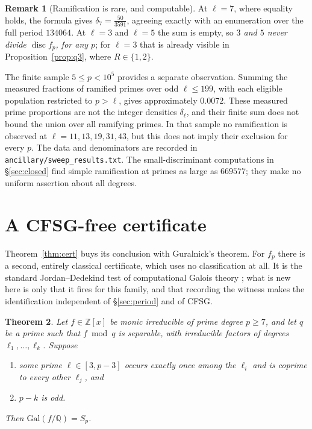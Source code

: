 \documentclass[11pt,a4paper]{amsart}
\newcommand{\Q}{\mathbb{Q}}
\newcommand{\Z}{\mathbb{Z}}
\newcommand{\Gal}{\mathrm{Gal}}
\newcommand{\disc}{\operatorname{disc}}
\theoremstyle{plain}
\newtheorem{theorem}{Theorem}
\theoremstyle{definition}
\newtheorem{remark}[theorem]{Remark}
\begin{document}
\begin{remark}[Ramification is rare, and computable]
At \(\ell=7\), where equality holds, the formula gives \(\delta_7=\tfrac{50}{3591}\), agreeing exactly with an enumeration over the full period \(134064\). At \(\ell=3\) and \(\ell=5\) the sum is empty, so \emph{\(3\) and \(5\) never divide \(\disc f_p\), for any \(p\)}; for \(\ell=3\) that is already visible in Proposition~\ref{prop:q3}, where \(R\in\{1,2\}\).

The finite sample \(5\le p<10^5\) provides a separate observation. Summing the measured fractions of ramified primes over odd \(\ell\le199\), with each eligible population restricted to \(p>\ell\), gives approximately \(0.0072\). These measured prime proportions are not the integer densities \(\delta_\ell\), and their finite sum does not bound the union over all ramifying primes. In that sample no ramification is observed at \(\ell=11,13,19,31,43\), but this does not imply their exclusion for every \(p\). The data and denominators are recorded in \texttt{ancillary/sweep\_results.txt}. The small-discriminant computations in \S\ref{sec:closed} find simple ramification at primes as large as \(669577\); they make no uniform assertion about all degrees.
\end{remark}

\section{A CFSG-free certificate}
\label{sec:jordan}

Theorem~\ref{thm:cert} buys its conclusion with Guralnick's theorem. For \(f_p\) there is a second, entirely classical certificate, which uses no classification at all. It is the standard Jordan--Dedekind test of computational Galois theory \cite{Unger,JonesCycle,Hulpke}; what is new here is only that it fires for this family, and that recording the witness makes the identification independent of \S\ref{sec:period} and of CFSG.

\begin{theorem}
\label{thm:jordan}
Let \(f\in\Z[x]\) be monic irreducible of prime degree \(p\ge7\), and let \(q\) be a prime such that \(f\bmod q\) is separable, with irreducible factors of degrees \(\ell_1,\dots,\ell_k\). Suppose
\begin{enumerate}
\item some \emph{prime} \(\ell\in[3,p-3]\) occurs exactly once among the \(\ell_i\) and is coprime to every other \(\ell_j\), and
\item \(p-k\) is odd.
\end{enumerate}
Then \(\Gal(f/\Q)=S_p\).
\end{theorem}
\end{document}
